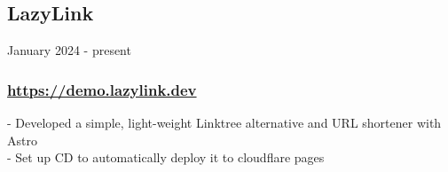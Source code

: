 
\subsection{LazyLink} January 2024 - present \\
\subsubsection{\href{https://demo.lazylink.dev}{https://demo.lazylink.dev}}
-\: Developed a simple, light-weight Linktree alternative and URL shortener with Astro \\
-\: Set up CD to automatically deploy it to cloudflare pages \\


